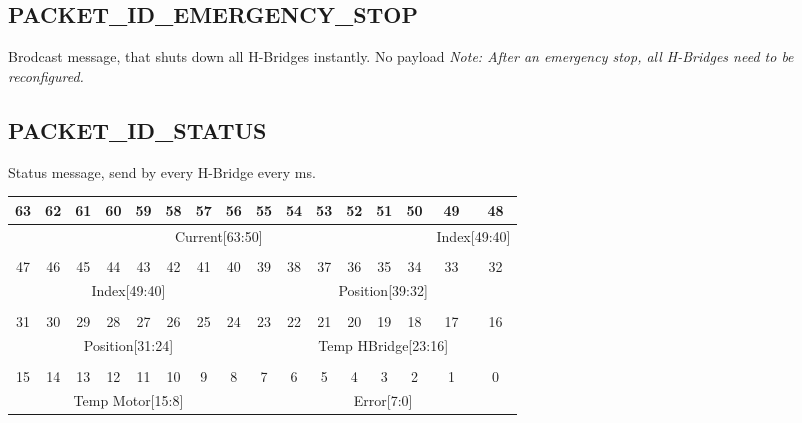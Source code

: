 \documentclass{article}
\begin{document}
\subsection{PACKET\_ID\_EMERGENCY\_STOP}
Brodcast message, that shuts down all H-Bridges instantly. No payload
{\em Note: After an emergency stop, all H-Bridges need to be reconfigured.}

\subsection{PACKET\_ID\_STATUS}
Status message, send by every H-Bridge every ms.\\
\begin{tabular} { c c c c c c c c c c c c c c c c}
  63&62&61&60&59&58&57&56&55&54&53&52&51&50&49&48\\
  \hline
  \multicolumn{14}{|c|}{Current[63:50]} & 
  \multicolumn{2}{c|}{Index[49:40]}\\
  \hline
  \multicolumn{16}{c}{} \\
  47&46&45&44&43&42&41&40&39&38&37&36&35&34&33&32\\
  \hline
  \multicolumn{8}{|c|}{Index[49:40]} &
  \multicolumn{8}{c|}{Position[39:32]}  \\
  \hline
  \multicolumn{16}{c}{} \\
  31&30&29&28&27&26&25&24&23&22&21&20&19&18&17&16\\
  \hline
  \multicolumn{8}{|c|}{Position[31:24]} &
  \multicolumn{8}{c|}{Temp HBridge[23:16]} \\
  \hline
  \multicolumn{16}{c}{} \\
  15&14&13&12&11&10&9&8&7&6&5&4&3&2&1&0\\
  \hline
  \multicolumn{8}{|c|}{Temp Motor[15:8]} &
  \multicolumn{8}{c|}{Error[7:0]} \\
  \hline
\end{tabular}
\end{document}
